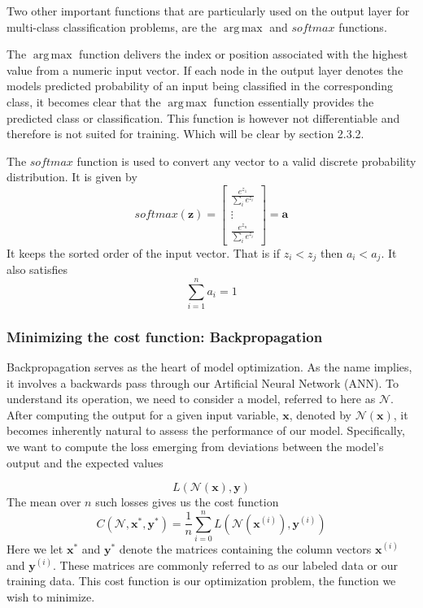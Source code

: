 \documentclass{article}
\theoremstyle{definition}
\DeclareMathOperator*{\argmax}{arg\,max}
\begin{document}
Two other important functions that are particularly used on the output layer for multi-class classification problems, are the $\argmax$ and $softmax$ functions.

The $\argmax$ function delivers the index or position associated with the highest value from a numeric input vector. If  each node in the output layer denotes the models predicted probability of an input being classified in the corresponding class, it becomes clear that the $\argmax$ function essentially provides the predicted class or classification. This function is however not differentiable and therefore is not suited for training. Which will be clear by section 2.3.2.

The $softmax$ function is used to convert any vector to a valid discrete probability distribution. It is given by
\[
softmax(\textbf{z}) = \begin{bmatrix}
\frac{e^{z_1}}{\sum_i e^{z_i}} \\
\vdots \\
\frac{e^{z_n}}{\sum_i e^{z_i}}
\end{bmatrix} = \textbf{a}
\]
It keeps the sorted order of the input vector. That is if $z_i < z_j$ then $a_i < a_j$. It also satisfies
\[
\sum_{i=1}^n a_i = 1
\]



\subsubsection{Minimizing the cost function: Backpropagation}

Backpropagation serves as the heart of model optimization. As the name implies, it involves a backwards pass through our Artificial Neural Network (ANN). To understand its operation, we need to consider a model, referred to here as $\mathcal{N}$. After computing the output for a given input variable, $\boldsymbol{x}$, denoted by $\mathcal{N}(\boldsymbol{x})$, it becomes inherently natural to assess the performance of our model. Specifically, we want to compute the loss emerging from deviations between the model's output and the expected values

\[
L(\mathcal{N}(\boldsymbol{x}), \mathbf{y})
\]
The mean over $n$ such losses gives us the cost function
\[
C(\mathcal{N}, \boldsymbol{x}^*, \mathbf{y}^*) = \frac{1}{n} \sum_{i=0}^{n}L(\mathcal{N}(\boldsymbol{x}^{(i)}), \mathbf{y}^{(i)})
\]
Here we let $\mathbf{x}^*$ and $\mathbf{y}^*$ denote the matrices containing the column vectors $\mathbf{x}^{(i)}$ and $\mathbf{y}^{(i)}$. These matrices are commonly referred to as our labeled data or our training data. This cost function is our optimization problem, the function we wish to minimize. 
\end{document}
